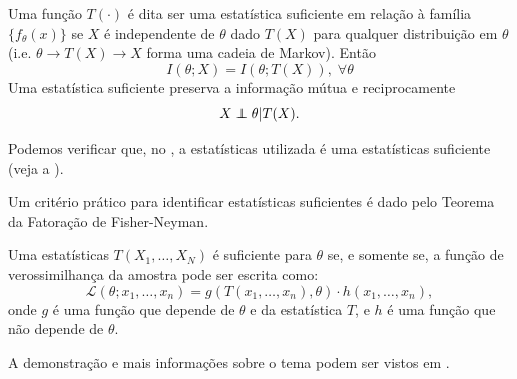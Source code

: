 \begin{definition}
Uma função $T(\cdot)$ é dita ser uma estatística suficiente em relação à família
$\{f_{\theta} (x)\}$ se $X$ é independente de $\theta$ dado $T(X)$ para qualquer
distribuição em $\theta$ (i.e. $\theta \rightarrow T(X) \rightarrow X$ forma uma
cadeia de Markov). Então
\begin{equation}
I(\theta ; X) = I(\theta ; T(X)), \; \forall \theta
\end{equation}
Uma estatística suficiente preserva a informação mútua e reciprocamente
\begin{equation}
X \independent \theta | T(X) .
\end{equation}
\end{definition}

Podemos verificar que, no , a estatísticas utilizada
é uma estatísticas suficiente (veja a ).


Um critério prático para identificar estatísticas suficientes é dado pelo Teorema da Fatoração de Fisher-Neyman.
\begin{theorem}
Uma estatísticas $T(X_1,\ldots,X_N)$ é suficiente para $\theta$ se, e somente se,
a função de verossimilhança da amostra pode ser escrita como:
\begin{equation}
  \mathcal{L}(\theta;x_1,\ldots,x_n) = g(T(x_1,\ldots,x_n),\theta) \cdot h(x_1,\ldots,x_n) ,
\end{equation}
onde $g$ é uma função que depende de $\theta$ e da estatística $T$, e $h$ é uma função que não depende de $\theta$.
\end{theorem}
A demonstração e mais informações sobre o tema podem ser vistos em \textcite{berger2002}.





